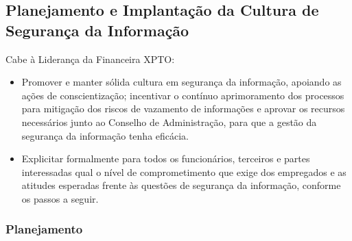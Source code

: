 \documentclass[a4paper,12pt]{article}
\begin{document}
\subsection{Planejamento e Implantação da Cultura de Segurança da Informação}

Cabe à Liderança da Financeira XPTO:

\begin{itemize}
    \item Promover e manter sólida cultura em segurança da informação, apoiando as ações de conscientização; incentivar o contínuo aprimoramento dos processos para mitigação dos riscos de vazamento de informações e aprovar os recursos necessários junto ao Conselho de Administração, para que a gestão da segurança da informação tenha eficácia.
    \item Explicitar formalmente para todos os funcionários, terceiros e partes interessadas qual o nível de comprometimento que exige dos empregados e as atitudes esperadas frente às questões de segurança da informação, conforme os passos a seguir.
\end{itemize}

\subsubsection{Planejamento}
\end{document}
